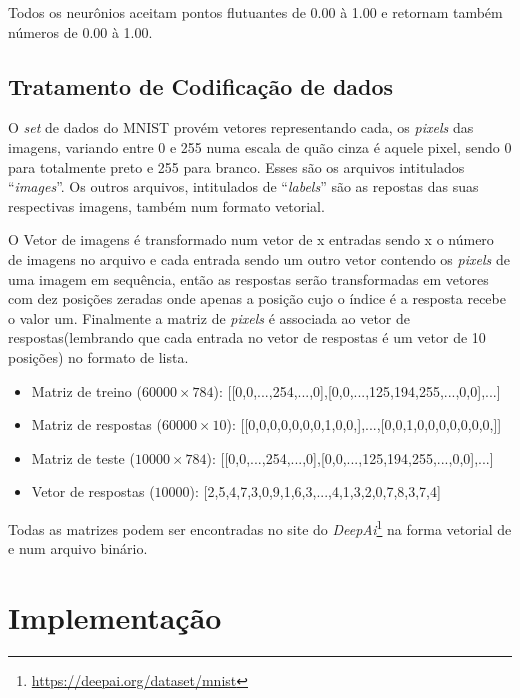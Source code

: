 \documentclass[
	article,			%
	11pt,				%
	oneside,			%
	a4paper,			%
	openany,
	english,			%
	brazil,				%
	sumario=tradicional
	]{abntex2}
\begin{document}
Todos os neurônios aceitam pontos flutuantes de 0.00 à 1.00
e retornam também números de 0.00 à 1.00.

\subsection{Tratamento de Codificação de dados}
O \emph{set} de dados do MNIST provém vetores representando
cada, os \emph{pixels} das imagens, variando entre 0 e 255 numa escala
de quão cinza é aquele pixel, sendo 0 para totalmente preto e 255
para branco. Esses são os arquivos intitulados ``\emph{images}''.
Os outros arquivos, intitulados de ``\emph{labels}'' são as repostas
das suas respectivas imagens, também num formato vetorial.

O Vetor de imagens é transformado num vetor de x entradas sendo x
o número de imagens no arquivo e cada entrada sendo um outro vetor
contendo os \emph{pixels} de uma imagem em sequência, então as
respostas serão transformadas em vetores com dez posições zeradas
onde apenas a posição cujo o índice é a resposta recebe o valor um.
Finalmente a matriz de \emph{pixels} é associada ao vetor de
respostas(lembrando que cada entrada no vetor de respostas é um
vetor de 10 posições) no formato de lista.

\begin{itemize}
	\item Matriz de treino (\(60000\times784\)):
		[[0,0,...,254,...,0],[0,0,...,125,194,255,...,0,0],...]
	\item Matriz de respostas (\(60000\times10\)):
		[[0,0,0,0,0,0,0,1,0,0,],...,[0,0,1,0,0,0,0,0,0,0,]]
	\item Matriz de teste (\(10000\times784\)):
		[[0,0,...,254,...,0],[0,0,...,125,194,255,...,0,0],...]
	\item Vetor de respostas (\(10000\)):
		[2,5,4,7,3,0,9,1,6,3,...,4,1,3,2,0,7,8,3,7,4]
\end{itemize}

Todas as matrizes podem ser encontradas no site do
\emph{DeepAi}\footnote{\url{https://deepai.org/dataset/mnist}}
na forma vetorial de e num arquivo binário.

\section{Implementação}
\end{document}
